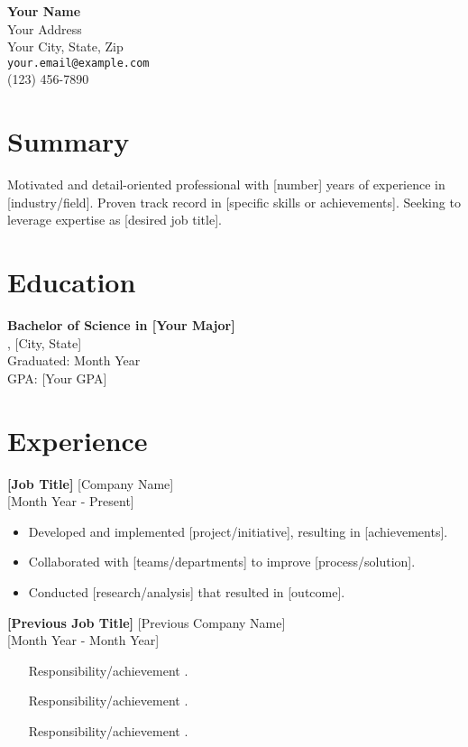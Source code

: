 \documentclass[a4paper,10pt]{article}
\makeatletter
\newcommand{\name}{Your Name}
\newcommand{\address}{Your Address}
\newcommand{\citystatezip}{Your City, State, Zip}
\newcommand{\email}{your.email@example.com}
\newcommand{\phone}{(123) 456-7890}
\makeatother
\begin{document}
\begin{center}
    {\LARGE \textbf{\name}} \\
    \vspace{5pt}
    \address \\
    \citystatezip \\
    \texttt{\email} \\
    \phone
\end{center}

\section*{Summary}
Motivated and detail-oriented professional with [number] years of experience in [industry/field]. Proven track record in [specific skills or achievements]. Seeking to leverage expertise as [desired job title].

\section*{Education}
\textbf{Bachelor of Science in [Your Major]} \\
[University Name], [City, State] \\
Graduated: Month Year \\
GPA: [Your GPA]

\section*{Experience}
\textbf{[Job Title]} \hfill [Company Name] \\
[City, State] \hfill [Month Year - Present]
\begin{itemize}[left=0pt]
    \item Developed and implemented [project/initiative], resulting in [achievements].
    \item Collaborated with [teams/departments] to improve [process/solution].
    \item Conducted [research/analysis] that resulted in [outcome].
\end{itemize}

\textbf{[Previous Job Title]} \hfill [Previous Company Name] \\
[City, State] \hfill [Month Year - Month Year]
\begin{itemize}[left=0pt]
    \item [Responsibility/achievement].
    \item [Responsibility/achievement].
    \item [Responsibility/achievement].
\end{itemize}
\end{document}
